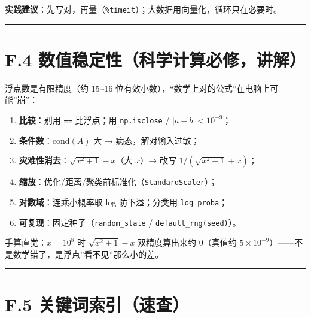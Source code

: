 \textbf{实践建议}：先写对，再量（\texttt{\%timeit}）；大数据用向量化，循环只在必要时。

\begin{center}\rule{0.5\linewidth}{0.5pt}\end{center}

\section{F.4
数值稳定性（科学计算必修，讲解）}\label{f.4-ux6570ux503cux7a33ux5b9aux6027ux79d1ux5b66ux8ba1ux7b97ux5fc5ux4feeux8bb2ux89e3}

浮点数是有限精度（约 15\textasciitilde16
位有效小数），``数学上对的公式''在电脑上可能''崩''：

\begin{enumerate}
\def\labelenumi{\arabic{enumi}.}
\tightlist
\item
  \textbf{比较}：别用 \texttt{==} 比浮点；用 \texttt{np.isclose} /
  \(|a-b|<10^{-9}\)；
\item
  \textbf{条件数}：\(\mathrm{cond}(A)\) 大 → 病态，解对输入过敏；
\item
  \textbf{灾难性消去}：\(\sqrt{x^2+1}-x\)（大 \(x\)）→ 改写
  \(1/(\sqrt{x^2+1}+x)\)；
\item
  \textbf{缩放}：优化/距离/聚类前标准化（\texttt{StandardScaler}）；
\item
  \textbf{对数域}：连乘小概率取 log 防下溢；分类用 \texttt{log\_proba}；
\item
  \textbf{可复现}：固定种子（\texttt{random\_state} /
  \texttt{default\_rng(seed)}）。
\end{enumerate}

手算直觉：\(x=10^8\) 时 \(\sqrt{x^2+1}-x\) 双精度算出来约 0（真值约
\(5\times 10^{-9}\)）------不是数学错了，是浮点''看不见''那么小的差。

\begin{center}\rule{0.5\linewidth}{0.5pt}\end{center}

\section{F.5
关键词索引（速查）}\label{f.5-ux5173ux952eux8bcdux7d22ux5f15ux901fux67e5}

